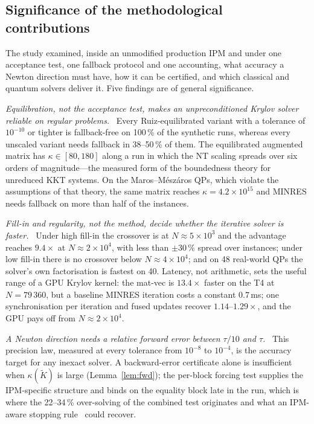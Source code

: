 \documentclass[11pt]{article}
\theoremstyle{definition}
\newcommand{\Kt}{\tilde K}
\newcommand{\lead}[1]{\emph{#1}\ }
\begin{document}
\subsection{Significance of the methodological contributions}
The study examined, inside an unmodified production IPM and under one acceptance test, one fallback protocol and one accounting, what accuracy a Newton direction must have, how it can be certified, and which classical and quantum solvers deliver it. Five findings are of general significance.

\lead{Equilibration, not the acceptance test, makes an unpreconditioned Krylov solver reliable on regular problems.} Every Ruiz-equilibrated variant with a tolerance of $10^{-10}$ or tighter is fallback-free on 100\,\% of the synthetic runs, whereas every unscaled variant needs fallback in 38--50\,\% of them. The equilibrated augmented matrix has $\kappa\in[80,180]$ along a run in which the NT scaling spreads over six orders of magnitude---the measured form of the boundedness theory for unreduced KKT systems. On the Maros--M\'esz\'aros QPs, which violate the assumptions of that theory, the same matrix reaches $\kappa=4.2\times10^{15}$ and MINRES needs fallback on more than half of the instances.

\lead{Fill-in and regularity, not the method, decide whether the iterative solver is faster.} Under high fill-in the crossover is at $N\approx5\times10^{3}$ and the advantage reaches $9.4\times$ at $N\approx2\times10^{4}$, with less than $\pm30\,\%$ spread over instances; under low fill-in there is no crossover below $N\approx4\times10^{4}$; and on 48 real-world QPs the solver's own factorisation is fastest on 40. Latency, not arithmetic, sets the useful range of a GPU Krylov kernel: the mat-vec is $13.4\times$ faster on the T4 at $N=79\,360$, but a baseline MINRES iteration costs a constant $0.7$\,ms; one synchronisation per iteration and fused updates recover $1.14$--$1.29\times$, and the GPU pays off from $N\approx2\times10^{4}$.

\lead{A Newton direction needs a relative forward error between $\tau/10$ and $\tau$.} This precision law, measured at every tolerance from $10^{-8}$ to $10^{-4}$, is the accuracy target for any inexact solver. A backward-error certificate alone is insufficient when $\kappa(\Kt)$ is large (Lemma~\ref{lem:fwd}); the per-block forcing test supplies the IPM-specific structure and binds on the equality block late in the run, which is where the 22--34\,\% over-solving of the combined test originates and what an IPM-aware stopping rule~\cite{zanetti2023stopping} could recover.
\end{document}
